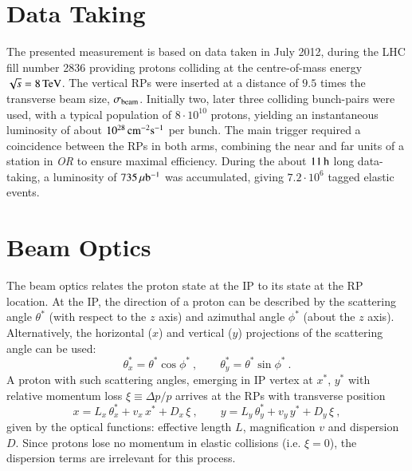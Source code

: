 \section{Data Taking}
\label{sec:data taking}

The presented measurement is based on data taken in July 2012, during the LHC fill number 2836 providing protons colliding at the centre-of-mass energy $\sqrt s = 8\,{\rm TeV}$. The vertical RPs were inserted at a distance of $9.5$ times the transverse beam size, $\sigma_{\rm beam}$. Initially two, later three colliding bunch-pairs were used, with a typical population of $8\cdot10^{10}$ protons, yielding an instantaneous luminosity of about $10^{28}\,{\rm cm^{-2}s^{-1}}$ per bunch. The main trigger required a coincidence between the RPs in both arms, combining the near and far units of a station in \textit{OR} to ensure maximal efficiency. During the about $11\,{\rm h}$ long data-taking, a luminosity of $735\,{\rm \mu b^{-1}}$ was accumulated, giving $7.2\cdot 10^6$ tagged elastic events.



\section{Beam Optics}
\label{sec:beam optics}

The beam optics relates the proton state at the IP to its state at the RP location. At the IP, the direction of a proton can be described by the scattering angle $\theta^*$ (with respect to the $z$ axis) and azimuthal angle $\phi^*$ (about the $z$ axis). Alternatively, the horizontal ($x$) and vertical ($y$) projections of the scattering angle can be used:
\begin{equation}
\label{eq:scatt angle}
\theta_x^* = \theta^* \cos\phi^*\ ,\qquad \theta_y^* = \theta^* \sin\phi^*\ .
\end{equation}
A proton with such scattering angles, emerging in IP vertex at $x^*$, $y^*$ with relative momentum loss $\xi \equiv \Delta p / p$ arrives at the RPs with transverse position
\begin{equation}
\label{eq:prot trans}
	x = L_x\, \theta_x^* + v_x\, x^* + D_x\, \xi\ ,\qquad y = L_y\, \theta_y^* + v_y\, y^* + D_y\, \xi\ ,
\end{equation}
given by the optical functions: effective length $L$, magnification $v$ and dispersion $D$. Since protons lose no momentum in elastic collisions 
(i.e. $\xi = 0$), the dispersion terms are irrelevant for this process.

